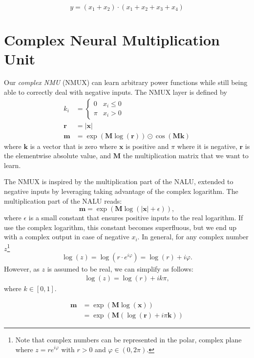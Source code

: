 \documentclass[9pt]{article}
\begin{document}
\begin{equation}
  \label{eq:nmu_task}
  y = (x_1 + x_2) \cdot (x_1 + x_2 + x_3 + x_4)
\end{equation}


\section{Complex Neural Multiplication Unit}%
\label{sec:complex_neural_multiplication_unit}

Our \emph{complex NMU} (NMUX) can learn arbitrary power functions while still
being able to correctly deal with negative inputs.
The NMUX layer is defined by
\begin{align}
  k_i &= \begin{cases}
     0  & x_i \leq 0 \\
    \pi & x_i > 0
  \end{cases} \\
  \bm r &= |\bm x| \\
  \bm m &= \exp(\bm M \log(\bm r)) \odot \cos(\bm M \bm k)
\end{align}
where $\bm k$ is a vector that is zero where $\bm x$ is positive and $\pi$
where it is negative, $\bm r$ is the elementwise absolute value, and $\bm M$
the multiplication matrix that we want to learn.

The NMUX is inspired by the multiplication part of the NALU, extended to
negative inputs by leveraging taking advantage of the complex logarithm.
The multiplication part of the NALU reads:
\begin{equation}
  \bm m = \exp(\bm M \log(|\bm x| + \epsilon)),
\end{equation}
where $\epsilon$ is a small constant that ensures positive inputs to the real
logarithm.  If use the complex logarithm, this constant becomes superfluous,
but we end up with a complex output in case of negative $x_i$.  In general, for
any complex number $z$\footnote{Note that complex numbers can be represented in
the polar, complex plane where $z=re^{i\varphi}$ with $r>0$ and $\varphi \in
(0,2\pi)$.}
\begin{align}
  \log(z) = \log\left(r\cdot e^{i\varphi}\right)
     = \log(r) + i\varphi.
\end{align}
However, as $z$ is assumed to be real, we can simplify as follows:
\begin{align}
  \log(z) = \log(r) + ik\pi,
\end{align}
where $k \in [0,1]$.

\begin{align}
  \bm m &= \exp(\bm M \log(\bm x)) \\
    &= \exp(\bm M ( \log(\bm r) + i\pi\bm k ))
\end{align}
\end{document}
